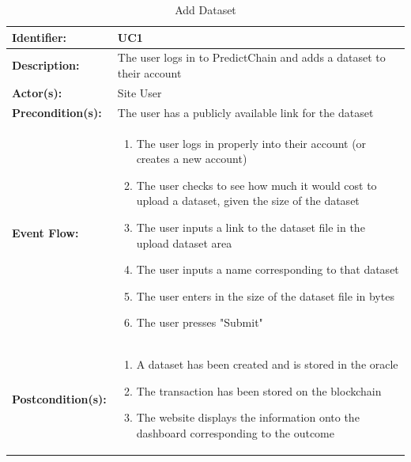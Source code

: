 \documentclass{article}
\begin{document}
    \begin{table}[H]
        \caption{Add Dataset}
        \label{tab:add-ds}
        \centering
        \begin{tabular}{|p{3cm}|p{12cm}|}
            \hline
            \textbf{Identifier:} & UC1 \\
            \hline
            \textbf{Description:} & The user logs in to PredictChain and adds a dataset to their account\\
            \hline
            \textbf{Actor(s):} & Site User \\
            \hline
            \textbf{Precondition(s):} & The user has a publicly available link for the dataset\\
            \hline
            \textbf{Event Flow:} &
            \begin{enumerate}
                \item The user logs in properly into their account (or creates a new account)
                \item The user checks to see how much it would cost to upload a dataset, given the size of the dataset
                \item The user inputs a link to the dataset file in the upload dataset area
                \item The user inputs a name corresponding to that dataset
                \item The user enters in the size of the dataset file in bytes
                \item The user presses "Submit"
            \end{enumerate} \\
            \hline
            \textbf{Postcondition(s):} &
            \begin{enumerate}
                \item A dataset has been created and is stored in the oracle
                \item The transaction has been stored on the blockchain
                \item The website displays the information onto the dashboard corresponding to the outcome
            \end{enumerate}\\
            \hline
        \end{tabular}
    \end{table}
\end{document}
